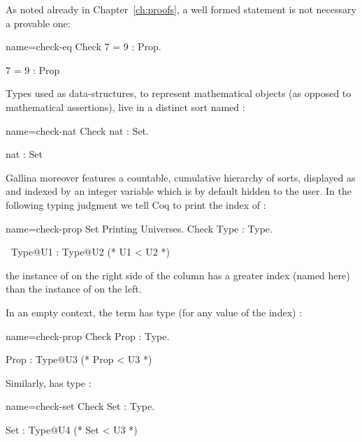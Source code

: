 As noted already in Chapter~\ref{ch:proofs}, a well formed statement
is not necessary a provable one:

\begin{coq-left}{name=check-eq}{}
Check 7 = 9 : Prop.
\end{coq-left}
\begin{coqout-right}
7 = 9 : Prop
\end{coqout-right}

Types used as data-structures, to represent mathematical objects (as
opposed to mathematical assertions), live in a distinct sort named
:

\begin{coq-left}{name=check-nat}{}
Check nat : Set.
\end{coq-left}
\begin{coqout-right}
nat : Set
\end{coqout-right}

Gallina moreover features a countable, cumulative hierarchy of sorts,
displayed as  and indexed by an integer variable which is by
default hidden to the user.  In the following typing judgment we tell Coq
to print the index of :

\begin{coq-left}{name=check-prop}{}
Set Printing Universes.
Check Type : Type.
\end{coq-left}
\begin{coqout-right}
$~$
Type@{U1} : Type@{U2} (* U1 < U2 *)
\end{coqout-right}

the instance of  on the right side of the column has a greater
index (named  here) than the instance of  on the left.

In an empty context,
the term  has type  (for any value of the index) :

\begin{coq-left}{name=check-prop}{}
Check Prop : Type.
\end{coq-left}
\begin{coqout-right}
Prop : Type@{U3} (* Prop < U3 *)
\end{coqout-right}

Similarly,  has type :

\begin{coq-left}{name=check-set}{}
Check Set : Type.
\end{coq-left}
\begin{coqout-right}
Set : Type@{U4} (* Set < U3 *)
\end{coqout-right}

